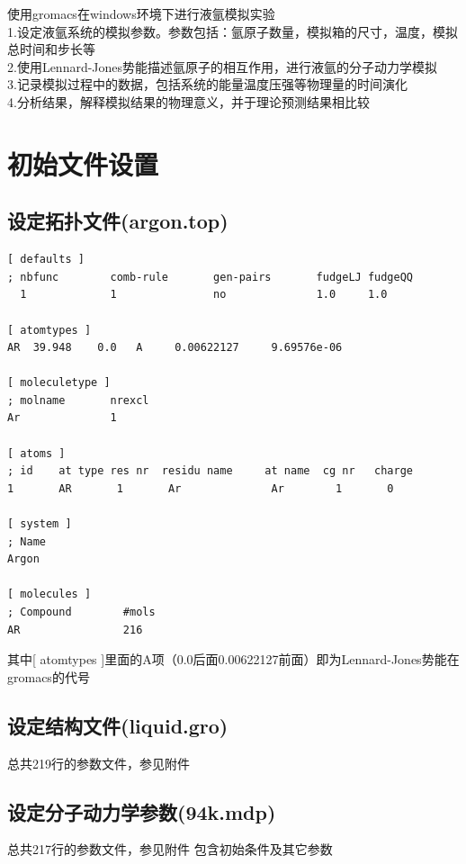 \documentclass[12pt, a4paper, oneside]{ctexart}
\begin{document}
\begin{spacing}{2.0}
使用gromacs在windows环境下进行液氩模拟实验\\
1.设定液氩系统的模拟参数。参数包括：氩原子数量，模拟箱的尺寸，温度，模拟总时间和步长等\\
2.使用Lennard-Jones势能描述氩原子的相互作用，进行液氩的分子动力学模拟\\
3.记录模拟过程中的数据，包括系统的能量温度压强等物理量的时间演化\\
4.分析结果，解释模拟结果的物理意义，并于理论预测结果相比较\\
\section{初始文件设置}
\subsection{设定拓扑文件(argon.top)}
\begin{lstlisting}[caption={argon.top}]
    [ defaults ]
; nbfunc        comb-rule       gen-pairs       fudgeLJ fudgeQQ
  1             1               no              1.0     1.0

[ atomtypes ]
AR  39.948    0.0   A     0.00622127     9.69576e-06

[ moleculetype ]
; molname       nrexcl
Ar              1

[ atoms ]
; id    at type res nr  residu name     at name  cg nr   charge
1       AR       1       Ar              Ar        1       0

[ system ]
; Name
Argon

[ molecules ]
; Compound        #mols
AR                216
\end{lstlisting}
其中[ atomtypes ]里面的A项（0.0后面0.00622127前面）即为Lennard-Jones势能在gromacs的代号
\subsection{设定结构文件(liquid.gro)}
总共219行的参数文件，参见附件
\subsection{设定分子动力学参数(94k.mdp)}
总共217行的参数文件，参见附件
包含初始条件及其它参数

\end{spacing}
\end{document}

